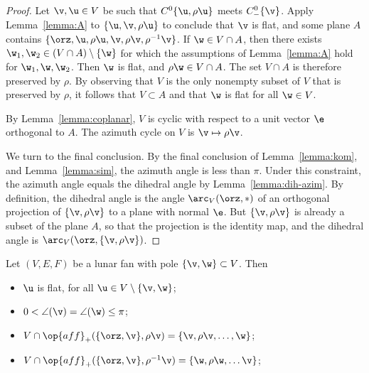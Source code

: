 \begin{proof} Let $\v, \u\in V$ be such that $C^0\{\u,\rho \u\}$ meets
$C^0_-\{\v\}$.  Apply Lemma~\ref{lemma:A} to $\{\u,\v,\rho \u\}$ to
conclude that $\v$ is flat, and some plane $A$ contains
$\{\orz,\u,\rho\u,\v,\rho \v,\rho^{-1} \v\}$.  If
$\w\in V\cap A$, then there exists $\w_1,\w_2\in (V\cap
A)\setminus\{\w\}$ for which the assumptions of Lemma~\ref{lemma:A}
hold for $\w_1,\w,\w_2$.  
Then $\w$ is flat, and $\rho \w \in V\cap A$.  The set $V\cap
A$ is therefore preserved by $\rho$.  By observing that $V$ is the
only nonempty subset of $V$ that is preserved by $\rho$, it follows
that $V\subset A$ and that $\w$ is flat for all $\w\in V$.


By Lemma~\ref{lemma:coplanar}, $V$ is cyclic with respect to a unit
vector $\e$ orthogonal to $A$.  The azimuth cycle on $V$ is $\v
\mapsto \rho \v$.

We turn to the final conclusion.  By the final conclusion of Lemma~\ref{lemma:kom}, and Lemma~\ref{lemma:sim}, the azimuth angle is less than $\pi$.  Under this
constraint, the azimuth angle equals the dihedral angle by Lemma~\ref{lemma:dih-azim}.
By definition, the dihedral angle is the angle $\arc_V(\orz,*)$ of an orthogonal projection of $\{\v,\rho\v\}$
to a plane with normal $\e$.  But $\{\v,\rho\v\}$ is already a subset of the plane $A$, so that
the projection is the identity map, and the dihedral angle is $\arc_V(\orz,\{\v,\rho\v\})$.
%
\end{proof}

\begin{lemma}\label{lemma:lunar}
Let $(V,E,F)$ be a lunar fan with pole $\{\v,\w\}\subset V$.  
Then
\begin{itemize}
\item $\u$ is flat, for all $\u\in V\setminus \{\v,\w\}$; \vspace{3pt}
\item $0< \angle(\v) = \angle(\w)\le \pi$; \vspace{3pt}
\item $V\cap \op{aff}_+(\{\orz,\v\},\rho \v) = \{\v,\rho \v,\ldots,
\w\}$; \vspace{3pt}
\item $V \cap \op{aff}_+(\{\orz,\v\},\rho^{-1} \v) = \{\w,\rho
\w,\ldots \v\}$; \vspace{3pt}
\end{itemize}
\end{lemma}


